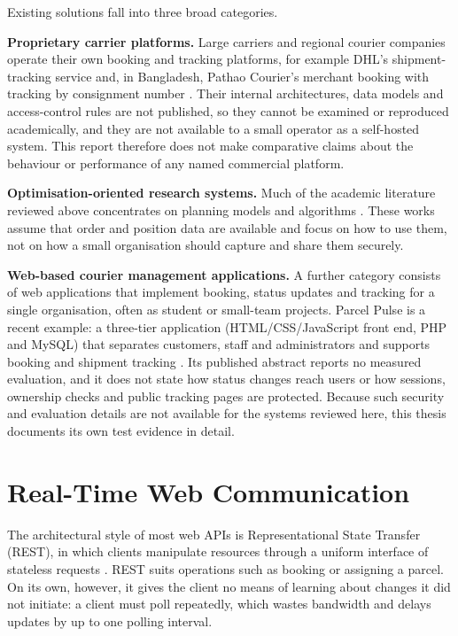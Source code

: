 Existing solutions fall into three broad categories.

\textbf{Proprietary carrier platforms.} Large carriers and regional courier companies operate their own booking and tracking platforms, for example DHL's shipment-tracking service \cite{dhltracking} and, in Bangladesh, Pathao Courier's merchant booking with tracking by consignment number \cite{pathaocourier}. Their internal architectures, data models and access-control rules are not published, so they cannot be examined or reproduced academically, and they are not available to a small operator as a self-hosted system. This report therefore does not make comparative claims about the behaviour or performance of any named commercial platform.

\textbf{Optimisation-oriented research systems.} Much of the academic literature reviewed above concentrates on planning models and algorithms \cite{boysen2021lastmile,savelsbergh2016city}. These works assume that order and position data are available and focus on how to use them, not on how a small organisation should capture and share them securely.

\textbf{Web-based courier management applications.} A further category consists of web applications that implement booking, status updates and tracking for a single organisation, often as student or small-team projects. Parcel Pulse is a recent example: a three-tier application (HTML/CSS/JavaScript front end, PHP and MySQL) that separates customers, staff and administrators and supports booking and shipment tracking \cite{chaudhary2025parcelpulse}. Its published abstract reports no measured evaluation, and it does not state how status changes reach users or how sessions, ownership checks and public tracking pages are protected. Because such security and evaluation details are not available for the systems reviewed here, this thesis documents its own test evidence in detail.

\section{Real-Time Web Communication}
\label{sec:lit-realtime}

The architectural style of most web APIs is Representational State Transfer (REST), in which clients manipulate resources through a uniform interface of stateless requests \cite{fielding2000rest}. REST suits operations such as booking or assigning a parcel. On its own, however, it gives the client no means of learning about changes it did not initiate: a client must poll repeatedly, which wastes bandwidth and delays updates by up to one polling interval.

